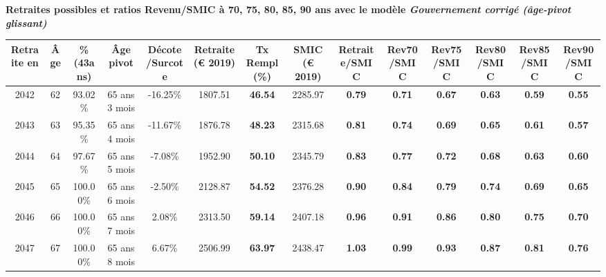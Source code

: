  \vspace{0.1cm} 
{\bf \noindent Retraites possibles et ratios Revenu/SMIC à 70, 75, 80, 85, 90 ans avec le modèle \emph{Gouvernement corrigé (âge-pivot glissant)}}  
 
\begin{adjustbox}{max width=\textwidth} 
\begin{tabular}[htb]{|c|c||c|c|c||c|c||c||c|c|c|c|c|c|} 
\hline 
 Retraite en &  Âge &  \%(43ans) &  Âge pivot &  Décote/Surcote &  Retraite (\euro{} 2019) &  Tx Rempl(\%) &  SMIC (\euro{} 2019) &  Retraite/SMIC &  Rev70/SMIC &  Rev75/SMIC &  Rev80/SMIC &  Rev85/SMIC &  Rev90/SMIC \\ 
\hline \hline 
 2042 &  62 &  93.02\% &  65 ans 3 mois &  -16.25\% &  1807.51 &  {\bf 46.54} &  2285.97 &  {\bf {\color{red} 0.79}} &  {\bf {\color{red} 0.71}} &  {\bf {\color{red} 0.67}} &  {\bf {\color{red} 0.63}} &  {\bf {\color{red} 0.59}} &  {\bf {\color{red} 0.55}} \\ 
\hline 
 2043 &  63 &  95.35\% &  65 ans 4 mois &  -11.67\% &  1876.78 &  {\bf 48.23} &  2315.68 &  {\bf {\color{red} 0.81}} &  {\bf {\color{red} 0.74}} &  {\bf {\color{red} 0.69}} &  {\bf {\color{red} 0.65}} &  {\bf {\color{red} 0.61}} &  {\bf {\color{red} 0.57}} \\ 
\hline 
 2044 &  64 &  97.67\% &  65 ans 5 mois &  -7.08\% &  1952.90 &  {\bf 50.10} &  2345.79 &  {\bf {\color{red} 0.83}} &  {\bf {\color{red} 0.77}} &  {\bf {\color{red} 0.72}} &  {\bf {\color{red} 0.68}} &  {\bf {\color{red} 0.63}} &  {\bf {\color{red} 0.60}} \\ 
\hline 
 2045 &  65 &  100.00\% &  65 ans 6 mois &  -2.50\% &  2128.87 &  {\bf 54.52} &  2376.28 &  {\bf {\color{red} 0.90}} &  {\bf {\color{red} 0.84}} &  {\bf {\color{red} 0.79}} &  {\bf {\color{red} 0.74}} &  {\bf {\color{red} 0.69}} &  {\bf {\color{red} 0.65}} \\ 
\hline 
 2046 &  66 &  100.00\% &  65 ans 7 mois &  2.08\% &  2313.50 &  {\bf 59.14} &  2407.18 &  {\bf {\color{red} 0.96}} &  {\bf {\color{red} 0.91}} &  {\bf {\color{red} 0.86}} &  {\bf {\color{red} 0.80}} &  {\bf {\color{red} 0.75}} &  {\bf {\color{red} 0.70}} \\ 
\hline 
 2047 &  67 &  100.00\% &  65 ans 8 mois &  6.67\% &  2506.99 &  {\bf 63.97} &  2438.47 &  {\bf 1.03} &  {\bf {\color{red} 0.99}} &  {\bf {\color{red} 0.93}} &  {\bf {\color{red} 0.87}} &  {\bf {\color{red} 0.81}} &  {\bf {\color{red} 0.76}} \\ 
\hline 
\hline 
\end{tabular} 
\end{adjustbox} 
 
